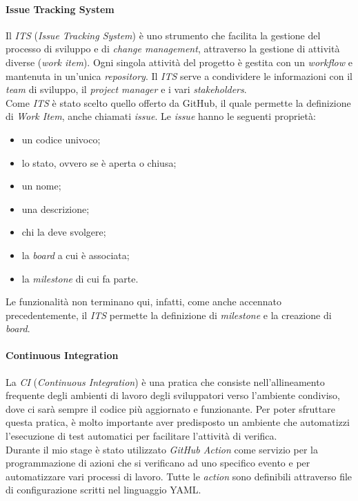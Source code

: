 \paragraph{Issue Tracking System}
Il \textit{ITS} (\textit{Issue Tracking System}) è uno strumento che facilita la gestione del processo di sviluppo e di \textit{change management}, attraverso la gestione di attività diverse (\textit{work item}). Ogni singola attività del progetto è gestita con un \textit{workflow} e mantenuta in un'unica \textit{repository}. Il \textit{ITS} serve a condividere le informazioni con il \textit{team} di sviluppo, il \textit{project manager} e i vari \textit{stakeholders}. \\

Come \textit{ITS} è stato scelto quello offerto da GitHub, il quale permette la definizione di \textit{Work Item}, anche chiamati \textit{issue}. Le \textit{issue} hanno le seguenti proprietà:
\begin{itemize}
  \item un codice univoco;
  \item lo stato, ovvero se è aperta o chiusa;
  \item un nome;
  \item una descrizione;
  \item chi la deve svolgere;
  \item la \textit{board} a cui è associata;
  \item la \textit{milestone} di cui fa parte.
\end{itemize}

Le funzionalità non terminano qui, infatti, come anche accennato precedentemente, il \textit{ITS} permette la definizione di \textit{milestone} e la creazione di \textit{board}.


\paragraph{Continuous Integration}
La \textit{CI} (\textit{Continuous Integration}) è una pratica che consiste nell'allineamento frequente degli ambienti di lavoro degli sviluppatori verso l'ambiente condiviso, dove ci sarà sempre il codice più aggiornato e funzionante. Per poter sfruttare questa pratica, è molto importante aver predisposto un ambiente che automatizzi l'esecuzione di test automatici per facilitare l'attività di verifica. \\

Durante il mio stage è stato utilizzato \textit{GitHub Action} come servizio per la programmazione di azioni che si verificano ad uno specifico evento e per automatizzare vari processi di lavoro. Tutte le \textit{action} sono definibili attraverso file di configurazione scritti nel linguaggio YAML.

